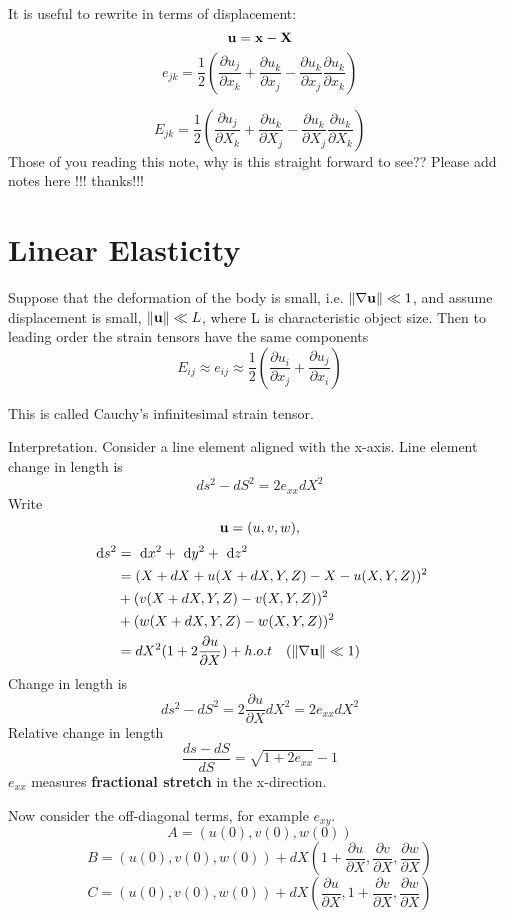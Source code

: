 \documentclass[12pt]{article}
\newcommand{\xx}{{\bf x}}
\newcommand{\uu}{{\bf u}}
\newcommand{\bX}{{\bf X}}
\newcommand{\bnabla}{{\bf \nabla}}
\newcommand{\dx}[1]{\text{ d}#1}
\begin{document}
It is useful to rewrite in terms of displacement:
\[
\uu = \xx - \bX
\]
\[
e_{jk} = \frac 1 2 ( \frac{\partial u_j}{\partial x_k}  +  \frac{\partial u_k}{\partial x_j} -  \frac{\partial u_k}{\partial x_j} \frac{\partial u_k}{\partial x_k}      )
\]

\[
E_{jk} = \frac 1 2 ( \frac{\partial u_j}{\partial X_k}  +  \frac{\partial u_k}{\partial X_j} -  \frac{\partial u_k}{\partial X_j} \frac{\partial u_k}{\partial X_k}      )
\]
Those of you reading this note, why is this straight forward to see??  Please add notes here !!! thanks!!!



\section{Linear Elasticity}
Suppose that the deformation of the body is small, i.e. $\|\bnabla \uu\| \ll 1$, and assume displacement is small, $\| \uu\|\ll L$, where L is characteristic object size. Then to leading order the strain tensors have the same components
\[
E_{ij} \approx e_{ij} \approx \frac 1 2 (\frac{\partial u_i}{\partial x_j} + \frac{\partial u_j}{\partial x_i})
\]

This is called Cauchy's infinitesimal strain tensor.

Interpretation. Consider a line element aligned with the x-axis. Line element change in length is 
\[
ds^2 - dS^2 = 2 e_{xx}dX^2
\]
Write
\[
\uu = (u, v, w),
\]
\begin{align*}
\dx{s^2} &= \dx{x^2} + \dx{y^2} + \dx{z^2} \\
 &= (X + dX + u(X+dX, Y, Z) - X- u(X,Y,Z))^2  \\
 &+   (v(X+dX,Y , Z)  - v(X,Y,Z))^2 \\
 &+  ( w(X+dX, Y, Z) - w(X,Y,Z))^2\\
 &= dX^2 (1+2\frac{\partial u}{\partial X} ) + h.o.t \quad (\|\nabla \uu \|\ll 1)
\end{align*}
Change in length is
\[
ds^2 - dS^2 = 2 \frac{\partial u}{\partial X} dX^2 = 2 e_{xx} dX^2
\]
Relative change in length
\[
\frac{ds-dS}{dS} = \sqrt{1+2e_{xx}}  -1
\]
$e_{xx}$ measures {\bf fractional stretch} in the x-direction.

Now consider the off-diagonal terms, for example $e_{xy}$.
\[
A = (u(0), v(0),w(0))
\]
\[
B = (u(0), v(0),w(0)) + dX(1+ \frac{\partial u}{\partial X},  \frac{\partial v}{\partial X},  \frac{\partial w}{\partial X})
\]
\[
C = (u(0), v(0),w(0))+ dX( \frac{\partial u}{\partial X},  1+\frac{\partial v}{\partial X},  \frac{\partial w}{\partial X})
\]
\end{document}
